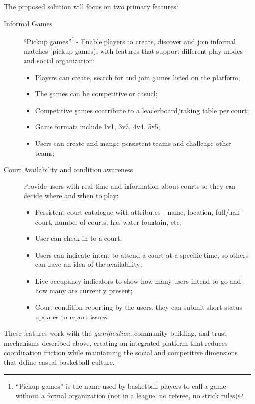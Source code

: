 The proposed solution will focus on two primary features:

\begin{description}
	\item [Informal Games] ``Pickup games''\footnote{``Pickup games'' is the name used by basketball players to call a game without a formal organization (not in a league, no referee, no strick rules)} -
	Enable players to create, discover and join informal matches (pickup games), with features that support different play modes and social organization:
	\begin{itemize}
		\item Players can create, search for and join games listed on the platform;
		\item The games can be competitive or casual;
		\item Competitive games contribute to a leaderboard/raking table per court;
		\item Game formats include 1v1, 3v3, 4v4, 5v5;
		\item Users can create and mange persistent teams and challenge other teams;
	\end{itemize}
	
	\item[Court Availability and condition awareness]
	Provide users with real-time and information about courts so they can decide where and when to play:
	\begin{itemize}
		\item Persistent court catalogue with attributes - name, location, full/half court, number of courts, has water fountain, etc;
		\item User can check-in to a court;
		\item Users can indicate intent to attend a court at a specific time, so others can have an idea of the availability;
		\item Live occupancy indicators to show how many users intend to go and how many are currently present;
		\item Court condition reporting by the users, they can submit short status updates to report issues.
	\end{itemize}
\end{description}

These features work with the \textit{gamification}, community-building, and trust mechanisms described above, creating an integrated platform that reduces coordination friction while maintaining the social and competitive dimensions that define casual basketball culture.









